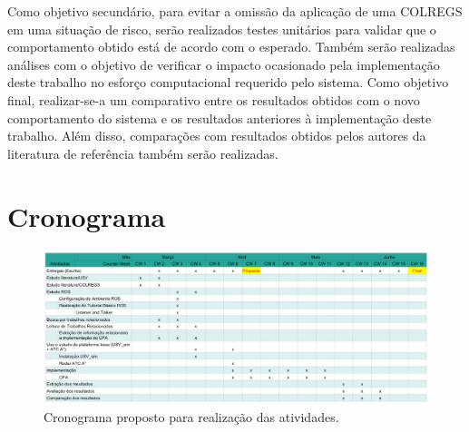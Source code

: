         Como objetivo secundário, para evitar a omissão da aplicação de uma COLREGS em uma situação de risco, serão realizados testes unitários para validar que o comportamento obtido está de acordo com o esperado. Também serão realizadas análises com o objetivo de verificar o impacto ocasionado pela implementação deste trabalho no esforço computacional requerido pelo sistema. Como objetivo final, realizar-se-a um comparativo entre os resultados obtidos com o novo comportamento do sistema e os resultados anteriores à implementação deste trabalho. Além disso, comparações com resultados obtidos pelos autores da literatura de referência também serão realizadas.
        
    \section{Cronograma}
    
    \begin{figure}[htb]
        \centering\includegraphics[width=1.3\textwidth, angle=90]{fig/chap3/schedule.png}
        \caption{\label{fig:schedule} Cronograma proposto para realização das atividades.}
    \end{figure}